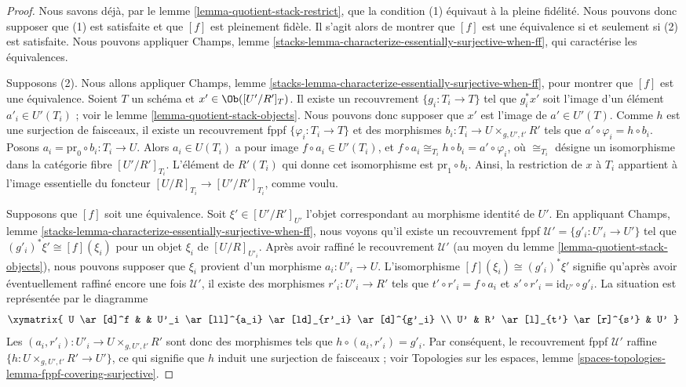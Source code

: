 \begin{proof}
Nous savons déjà, par le lemme \ref{lemma-quotient-stack-restrict}, que la
condition (1) équivaut à la pleine fidélité. Nous pouvons donc supposer que
(1) est satisfaite et que $[f]$ est pleinement fidèle. Il s'agit alors de
montrer que $[f]$ est une équivalence si et seulement si (2) est satisfaite.
Nous pouvons appliquer Champs, lemme
\ref{stacks-lemma-characterize-essentially-surjective-when-ff}, qui
caractérise les équivalences.

\medskip\noindent
Supposons (2). Nous allons appliquer Champs, lemme
\ref{stacks-lemma-characterize-essentially-surjective-when-ff}, pour montrer
que $[f]$ est une équivalence. Soient $T$ un schéma et
$x' \in \Ob([U'/R']_T)$. Il existe un recouvrement
$\{g_i : T_i \to T\}$ tel que $g_i^*x'$ soit l'image d'un élément
$a'_i \in U'(T_i)$ ; voir le lemme \ref{lemma-quotient-stack-objects}.
Nous pouvons donc supposer que $x'$ est l'image de $a' \in U'(T)$. Comme
$h$ est une surjection de faisceaux, il existe un recouvrement fppf
$\{\varphi_i : T_i \to T\}$ et des morphismes
$b_i : T_i \to U \times_{g, U', t'} R'$ tels que
$a' \circ \varphi_i = h \circ b_i$. Posons
$a_i = \text{pr}_0 \circ b_i : T_i \to U$. Alors $a_i \in U(T_i)$ a pour
image $f \circ a_i \in U'(T_i)$, et
$f \circ a_i \cong_{T_i} h \circ b_i = a' \circ \varphi_i$, où
$\cong_{T_i}$ désigne un isomorphisme dans la catégorie fibre
$[U'/R']_{T_i}$. L'élément de $R'(T_i)$ qui donne cet isomorphisme est
$\text{pr}_1 \circ b_i$. Ainsi, la restriction de $x$ à $T_i$ appartient à
l'image essentielle du foncteur
$[U/R]_{T_i} \to [U'/R']_{T_i}$, comme voulu.

\medskip\noindent
Supposons que $[f]$ soit une équivalence. Soit
$\xi' \in [U'/R']_{U'}$ l'objet correspondant au morphisme identité de
$U'$. En appliquant Champs, lemme
\ref{stacks-lemma-characterize-essentially-surjective-when-ff}, nous voyons
qu'il existe un recouvrement fppf
$\mathcal{U}' = \{g'_i : U'_i \to U'\}$ tel que
$(g'_i)^*\xi' \cong [f](\xi_i)$ pour un objet $\xi_i$ de
$[U/R]_{U'_i}$. Après avoir raffiné le recouvrement $\mathcal{U}'$ (au moyen
du lemme \ref{lemma-quotient-stack-objects}), nous pouvons supposer que
$\xi_i$ provient d'un morphisme $a_i : U'_i \to U$. L'isomorphisme
$[f](\xi_i) \cong (g'_i)^*\xi'$ signifie qu'après avoir éventuellement
raffiné encore une fois $\mathcal{U}'$, il existe des morphismes
$r'_i : U'_i \to R'$ tels que $t' \circ r'_i = f \circ a_i$ et
$s' \circ r'_i = \text{id}_{U'} \circ g'_i$. La situation est représentée
par le diagramme
$$
\xymatrix{
U \ar[d]^f & & U'_i \ar[ll]^{a_i} \ar[ld]_{r'_i} \ar[d]^{g'_i} \\
U' & R' \ar[l]_{t'} \ar[r]^{s'} & U'
}
$$
Les $(a_i, r'_i) : U'_i \to U \times_{g, U', t'} R'$ sont donc des
morphismes tels que $h \circ (a_i, r'_i) = g'_i$. Par conséquent, le
recouvrement fppf $\mathcal{U}'$ raffine
$\{h : U \times_{g, U', t'} R' \to U'\}$, ce qui signifie que $h$ induit
une surjection de faisceaux ; voir Topologies sur les espaces, lemme
\ref{spaces-topologies-lemma-fppf-covering-surjective}.


\end{proof}
